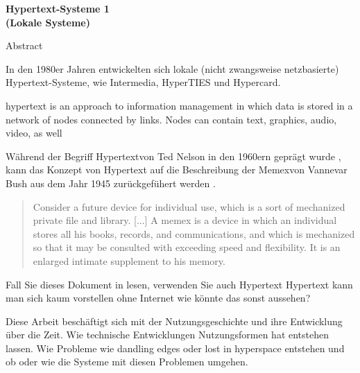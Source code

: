 \begin{centering}
\textbf { \LARGE
Hypertext-Systeme 1
\\(Lokale Systeme)
\\[1.2cm]
}
\end{centering}

{\large
Abstract
}

{
In den 1980er Jahren entwickelten sich lokale (nicht zwangsweise netzbasierte) Hypertext-Systeme, wie Intermedia, HyperTIES und Hypercard.

hypertext is
an approach to information management in which data
is stored in a network of nodes connected by links.
Nodes can contain text, graphics, audio, video, as well

Während der Begriff \glqq Hypertext\grqq{ }von Ted Nelson in den 1960ern geprägt wurde \cite{Nelson1965}, kann das Konzept von Hypertext auf die Beschreibung der \glqq Memex\grqq{ }von Vannevar Bush aus dem Jahr 1945 zurückgefühert werden \cite{Bush1945}.

\begin{quote}
	\glqq Consider a future device for individual use, which is a sort of mechanized private file and library. [...] A memex is a device in which an individual stores all his books, records, and communications, and which is mechanized so that it may be consulted with exceeding speed and flexibility. It is an enlarged intimate supplement to his memory.\grqq{ }\cite{Bush1945}
\end{quote}

Fall Sie dieses Dokument in lesen, verwenden Sie auch Hypertext
Hypertext kann man sich kaum vorstellen ohne Internet
	wie könnte das sonst aussehen?

Diese Arbeit beschäftigt sich mit der Nutzungsgeschichte und ihre Entwicklung über die Zeit.
Wie technische Entwicklungen Nutzungsformen hat entstehen lassen. 
Wie Probleme wie \glqq dandling edges\grqq{ } oder \glqq lost in hyperspace\grqq{ } entstehen und ob oder wie die Systeme mit diesen Problemen umgehen.

}
